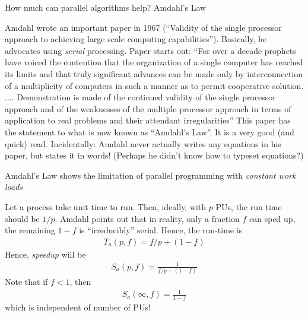 \documentclass[aspectratio=169]{beamer}
\newcommand{\mypause}{\pause}
\begin{document}
\begin{frame}{How much can parallel algorithms help? Amdahl's Law}

  Amdahl wrote an important paper in 1967 (``Validity of the single
  processor approach to achieving large scale computing
  capabilities''). Basically, he advocates using \emph{serial}
  processing. Paper starts out: {\color{blue} ``For over a decade
    prophets have voiced the contention that the organization of a
    single computer has reached its limits and that truly significant
    advances can be made only by interconnection of a multiplicity of
    computers in such a manner as to permit cooperative
    solution. .... Demonstration is made of the continued validity of
    the single processor approach and of the weaknesses of the
    multiple processor approach in terms of application to real
    problems and their attendant irregularities''}%
  \vskip0.1in%
  This paper has the statement to what is now known as ``Amdahl's
  Law''. It is a very good (and quick) read.%
  \vskip0.1in%
  \mypause%
  Incidentally: Amdahl never actually writes any equations in his
  paper, but states it in words! (Perhaps he didn't know how to
  typeset equations?)

\end{frame}

\begin{frame}{Amdahl's Law shows the limitation of parallel
    programming with \emph{constant work loads}}

  Let a process take unit time to run. Then, ideally, with $p$ PUs,
  the run time should be $1/p$. Amdahl points out that in reality,
  only a fraction $f$ can sped up, the remaining $1-f$ is
  ``irreducibly'' serial. Hence, the run-time is
  \begin{align*}
    T_a(p,f) = f/p + (1-f)
  \end{align*}
  Hence, \emph{speedup} will be
  \begin{align*}
    S_a(p,f) = \frac{1}{f/p + (1-f)}
  \end{align*}
  Note that if $f<1$, then
  \begin{align*}
    S_a(\infty,f) = \frac{1}{1-f}
  \end{align*}
  which is independent of number of PUs!

\end{frame}
\end{document}
